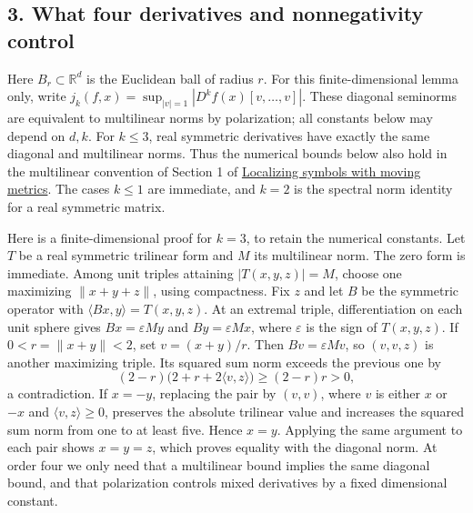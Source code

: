 \documentclass[
  11pt,
]{article}
\makeatletter
\let\ReaderOriginalAnchorStart\hyper@anchorstart
\let\ReaderOriginalAnchorEnd\hyper@anchorend
\let\ReaderPendingAliases\@empty
\def\ReaderArmAliases#1{\gdef\ReaderPendingAliases{#1}}
\def\hyper@anchorstart#1{\ReaderIfNativeAnchorTF{#1}{\ReaderPendingAliases\global\let\ReaderPendingAliases\@empty}{}\ReaderOriginalAnchorStart{#1}}
\makeatother
\begin{document}
\ReaderArmAliases{\ReaderOriginalAnchorStart{AN03-SFP-003}\ReaderOriginalAnchorEnd\begingroup\expandafter\def\csname @currentHref\endcsname{AN03-SFP-003}\label{AN03-SFP-003}\endgroup\ReaderOriginalAnchorStart{an03-sfp-003-what-four-derivatives-and-nonnegativity-control}\ReaderOriginalAnchorEnd\begingroup\expandafter\def\csname @currentHref\endcsname{an03-sfp-003-what-four-derivatives-and-nonnegativity-control}\label{an03-sfp-003-what-four-derivatives-and-nonnegativity-control}\endgroup\ReaderOriginalAnchorStart{3-what-four-derivatives-and-nonnegativity-control}\ReaderOriginalAnchorEnd\begingroup\expandafter\def\csname @currentHref\endcsname{3-what-four-derivatives-and-nonnegativity-control}\label{3-what-four-derivatives-and-nonnegativity-control}\endgroup\ReaderOriginalAnchorStart{what-four-derivatives-and-nonnegativity-control}\ReaderOriginalAnchorEnd}
\subsection{3. What four derivatives and nonnegativity
control}\label{what-four-derivatives-and-nonnegativity-control}

Here \(B_r\subset\mathbb R^d\) is the Euclidean ball of radius \(r\).
For this finite-dimensional lemma only, write
\(j_k(f,x)=\sup_{|v|=1}|D^kf(x)[v,\ldots,v]|\). These diagonal seminorms
are equivalent to multilinear norms by polarization; all constants below
may depend on \(d,k\). For \(k\leq3\), real symmetric derivatives have
exactly the same diagonal and multilinear norms. Thus the numerical
bounds below also hold in the multilinear convention of Section 1 of
\href{metric-localization.pdf}{Localizing symbols with moving metrics}.
The cases \(k\leq1\) are immediate, and \(k=2\) is the spectral norm
identity for a real symmetric matrix.

Here is a finite-dimensional proof for \(k=3\), to retain the numerical
constants. Let \(T\) be a real symmetric trilinear form and \(M\) its
multilinear norm. The zero form is immediate. Among unit triples
attaining \(|T(x,y,z)|=M\), choose one maximizing \(\|x+y+z\|\), using
compactness. Fix \(z\) and let \(B\) be the symmetric operator with
\(\langle Bx,y\rangle=T(x,y,z)\). At an extremal triple, differentiation
on each unit sphere gives \(Bx=\varepsilon My\) and
\(By=\varepsilon Mx\), where \(\varepsilon\) is the sign of
\(T(x,y,z)\). If \(0<r=\|x+y\|<2\), set \(v=(x+y)/r\). Then
\(Bv=\varepsilon Mv\), so \((v,v,z)\) is another maximizing triple. Its
squared sum norm exceeds the previous one by \[
(2-r)\bigl(2+r+2\langle v,z\rangle\bigr)\geq(2-r)r>0,
\] a contradiction. If \(x=-y\), replacing the pair by \((v,v)\), where
\(v\) is either \(x\) or \(-x\) and \(\langle v,z\rangle\geq0\),
preserves the absolute trilinear value and increases the squared sum
norm from one to at least five. Hence \(x=y\). Applying the same
argument to each pair shows \(x=y=z\), which proves equality with the
diagonal norm. At order four we only need that a multilinear bound
implies the same diagonal bound, and that polarization controls mixed
derivatives by a fixed dimensional constant.
\end{document}
